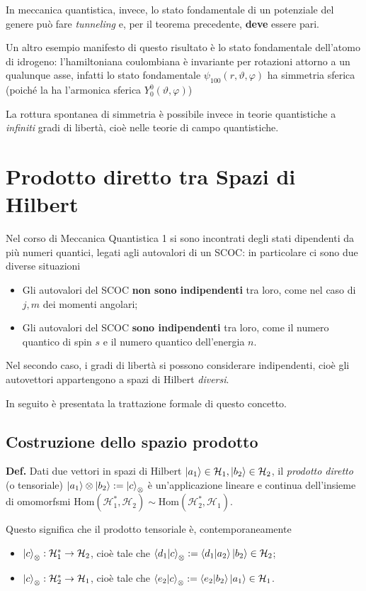 In meccanica quantistica, invece, lo stato fondamentale di un potenziale del genere può fare
\textit{tunneling} e, per il teorema precedente, \textbf{deve} essere pari.

Un altro esempio manifesto di questo risultato è lo stato fondamentale dell'atomo di idrogeno: l'hamiltoniana
coulombiana è invariante per rotazioni attorno a un qualunque asse, infatti lo stato fondamentale
$\psi_{100}(r,\vartheta,\varphi)$ ha simmetria sferica (poiché la ha l'armonica sferica
$Y_0^0(\vartheta,\varphi)$)


La rottura spontanea di simmetria è possibile invece in teorie quantistiche a \textit{infiniti} gradi
di libertà, cioè nelle teorie di campo quantistiche.

\section{Prodotto diretto tra Spazi di Hilbert}
Nel corso di Meccanica Quantistica 1 si sono incontrati degli stati dipendenti da 
più numeri quantici, legati agli autovalori di un SCOC: in particolare ci sono due 
diverse situazioni
\begin{itemize}
    \item Gli autovalori del SCOC \textbf{non sono indipendenti} tra loro, come
	nel caso di $j,m$ dei momenti angolari;
    \item Gli autovalori del SCOC \textbf{sono indipendenti} tra loro, come il
	numero quantico di spin $s$ e il numero quantico dell'energia $n$.
\end{itemize}
Nel secondo caso, i gradi di libertà si possono considerare indipendenti, cioè gli
autovettori appartengono a spazi di Hilbert \textit{diversi}. 

In seguito è presentata la trattazione formale di questo concetto.
\subsection{Costruzione dello spazio prodotto}
\textbf{Def.} Dati due vettori in spazi di Hilbert
$\ket{a_1}\in\mathcal{H}_1,\ket{b_2}\in\mathcal{H}_2$, il \textit{prodotto diretto}
(o tensoriale) $\ket{a_1}\otimes\ket{b_2} := \ket{c}_\otimes$ è un'applicazione
lineare e continua dell'insieme di omomorfsmi 
$\text{Hom}(\mathcal{H}_1^*,\mathcal{H}_2) \sim \text{Hom}(\mathcal{H}_2^*,\mathcal{H}_1)$.

Questo significa che il prodotto tensoriale è, contemporaneamente
\begin{itemize}
\item $\ket{c}_\otimes: \mathcal{H}_1^*\to\mathcal{H}_2$, cioè tale che
    $\bra{d_1}\ket{c}_\otimes := \bra{d_1}\ket{a_2}\ket{b_2}\in\mathcal{H}_2$;
\item $\ket{c}_\otimes: \mathcal{H}_2^*\to\mathcal{H}_1$, cioè tale che
$\bra{e_2}\ket{c}_\otimes := \bra{e_2}\ket{b_2}\ket{a_1}\in\mathcal{H}_1$.
\end{itemize}

